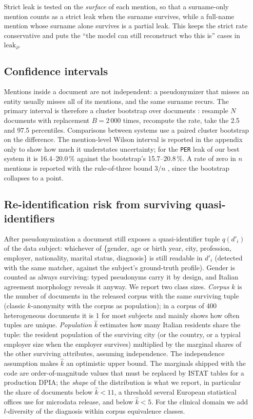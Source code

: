 \documentclass[11pt,a4paper]{article}
\newcommand{\pseud}[1]{\texttt{#1}}
\newcommand{\dprime}{d'}
\begin{document}
Strict leak is tested on the \emph{surface} of each mention, so that a surname-only mention counts as a strict leak when the surname survives, while a full-name mention whose surname alone survives is a partial leak. This keeps the strict rate conservative and puts the ``the model can still reconstruct who this is'' cases in $\mathrm{leak}_\partial$.

\subsection{Confidence intervals}
\label{sec:ci}
Mentions inside a document are not independent: a pseudonymizer that misses an entity usually misses all of its mentions, and the same surname recurs. The primary interval is therefore a cluster bootstrap over documents \citep{efron1993bootstrap,field2007clustered}: resample $N$ documents with replacement $B=2\,000$ times, recompute the rate, take the 2.5 and 97.5 percentiles. Comparisons between systems use a paired cluster bootstrap on the difference. The mention-level Wilson interval \citep{wilson1927} is reported in the appendix only to show how much it understates uncertainty; for the \pseud{PER} leak of our best system it is 16.4--20.0\,\% against the bootstrap's 15.7--20.8\,\%. A rate of zero in $n$ mentions is reported with the rule-of-three bound $3/n$ \citep{hanley1983ruleofthree}, since the bootstrap collapses to a point.

\subsection{Re-identification risk from surviving quasi-identifiers}
\label{sec:kanon}
After pseudonymization a document still exposes a quasi-identifier tuple $q(\dprime_i)$ of the data subject: whichever of \{gender, age or birth year, city, profession, employer, nationality, marital status, diagnosis\} is still readable in $\dprime_i$ (detected with the same matcher, against the subject's ground-truth profile). Gender is counted as always surviving: typed pseudonyms carry it by design, and Italian agreement morphology reveals it anyway. We report two class sizes. \emph{Corpus $k$} is the number of documents in the released corpus with the same surviving tuple (classic $k$-anonymity with the corpus as population); in a corpus of 400 heterogeneous documents it is 1 for most subjects and mainly shows how often tuples are unique. \emph{Population $\hat k$} estimates how many Italian residents share the tuple: the resident population of the surviving city (or the country, or a typical employer size when the employer survives) multiplied by the marginal shares of the other surviving attributes, assuming independence. The independence assumption makes $\hat k$ an optimistic upper bound. The marginals shipped with the code are order-of-magnitude values that must be replaced by ISTAT tables for a production DPIA; the \emph{shape} of the distribution is what we report, in particular the share of documents below $\hat k<11$, a threshold several European statistical offices use for microdata release, and below $\hat k<5$. For the clinical domain we add $l$-diversity \citep{machanavajjhala2007} of the diagnosis within corpus equivalence classes.
\end{document}
